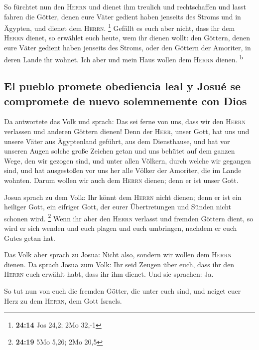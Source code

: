  So fürchtet nun den \textsc{Herrn} und dienet ihm
treulich und rechtschaffen und lasst fahren die Götter, denen eure Väter
gedient haben jenseits des Stroms und in Ägypten, und dienet dem
\textsc{Herrn}. \footnote{\textbf{24:14} Jos 24,2; 2Mo 32,-1}
 Gefällt es euch aber nicht, dass ihr dem \textsc{Herrn}
dienet, so erwählet euch heute, wem ihr dienen wollt: den Göttern, denen
eure Väter gedient haben jenseits des Stroms, oder den Göttern der
Amoriter, in deren Lande ihr wohnet. Ich aber und mein Haus wollen dem
\textsc{Herrn} dienen. \textsuperscript{b}

\hypertarget{el-pueblo-promete-obediencia-leal-y-josuuxe9-se-compromete-de-nuevo-solemnemente-con-dios}{%
\subsection{El pueblo promete obediencia leal y Josué se compromete de
nuevo solemnemente con
Dios}\label{el-pueblo-promete-obediencia-leal-y-josuuxe9-se-compromete-de-nuevo-solemnemente-con-dios}}

 Da antwortete das Volk und sprach: Das sei ferne von
uns, dass wir den \textsc{Herrn} verlassen und anderen Göttern dienen!
 Denn der \textsc{Herr}, unser Gott, hat uns und unsere
Väter aus Ägyptenland geführt, aus dem Diensthause, und hat vor unseren
Augen solche große Zeichen getan und uns behütet auf dem ganzen Wege,
den wir gezogen sind, und unter allen Völkern, durch welche wir gegangen
sind,  und hat ausgestoßen vor uns her alle Völker der
Amoriter, die im Lande wohnten. Darum wollen wir auch dem \textsc{Herrn}
dienen; denn er ist unser Gott.

 Josua sprach zu dem Volk: Ihr könnt dem \textsc{Herrn}
nicht dienen; denn er ist ein heiliger Gott, ein eifriger Gott, der
eurer Übertretungen und Sünden nicht schonen wird. \footnote{\textbf{24:19}
  5Mo 5,26; 2Mo 20,5}  Wenn ihr aber den \textsc{Herrn}
verlasst und fremden Göttern dient, so wird er sich wenden und euch
plagen und euch umbringen, nachdem er euch Gutes getan hat.

 Das Volk aber sprach zu Josua: Nicht also, sondern wir
wollen dem \textsc{Herrn} dienen.  Da sprach Josua zum
Volk: Ihr seid Zeugen über euch, dass ihr den \textsc{Herrn} euch
erwählt habt, dass ihr ihm dienet. Und sie sprachen: Ja.

 So tut nun von euch die fremden Götter, die unter euch
sind, und neiget euer Herz zu dem \textsc{Herrn}, dem Gott Israels.

